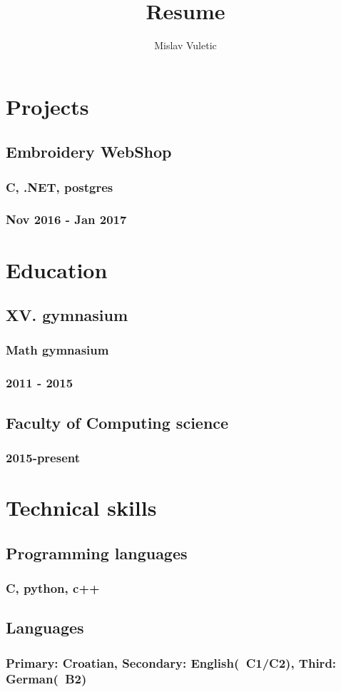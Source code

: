 \documentclass{article}
\renewcommand{\maketitle}
{\noindent\Huge\bfseries\theauthor}
\begin{document}
\title{Resume}
\author{Mislav Vuletic}

\maketitle

\section{Projects}

\subsection{Embroidery WebShop}
\subsubsection{C, .NET, postgres}
\subsubsection{Nov 2016 - Jan 2017}

\section{Education}
\subsection{XV. gymnasium}
\subsubsection{Math gymnasium}
\subsubsection{2011 - 2015}

\subsection{Faculty of Computing science}
\subsubsection{2015-present}

\section{Technical skills}
\subsection{Programming languages}
\subsubsection{C, python, c++}
\subsection{Languages}
\subsubsection{Primary: Croatian, Secondary: English(~C1/C2), Third: German(~B2)}
\end{document}
